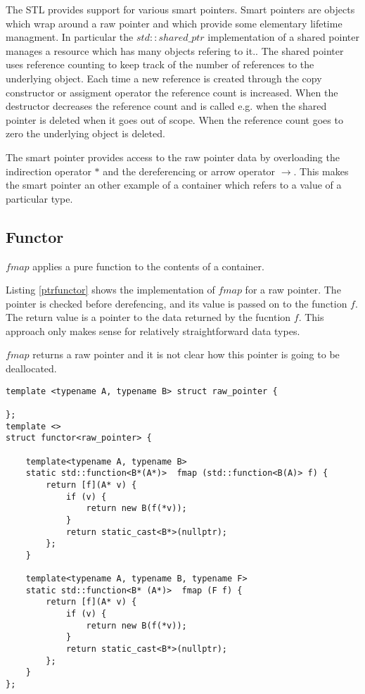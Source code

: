\documentclass[12pt,fleqn]{article}
\begin{document}
The STL provides support for various smart pointers.
Smart pointers are objects which wrap around a raw pointer and which provide some elementary lifetime managment.
In particular the $std::shared\_ptr$ implementation of a shared pointer manages a resource which has many objects refering to it..
The shared pointer uses reference counting to keep track of the number of references to the underlying object.
Each time a new reference is created through the copy constructor or assigment operator the reference count is increased.
When the destructor decreases the reference count and is called e.g. when the shared pointer is deleted when it goes out of scope.
When the reference count goes to zero the underlying object is deleted.

The smart pointer provides access to the raw pointer data by overloading the indirection operator $*$ and the dereferencing or arrow operator $\rightarrow$.
This makes the smart pointer an other example of a container which refers to a value of a particular type.


%
\subsection{Functor}
%
%
%

$fmap$ applies a pure function to the contents of a container.

Listing \ref{ptrfunctor} shows the implementation of $fmap$ for a raw pointer.
The pointer is checked before derefencing, and its value is passed on to the function $f$.
The return value is a pointer to the data returned by the fucntion $f$.
This approach only makes sense for relatively straightforward data types.

$fmap$ returns a raw pointer and it is not clear how this pointer is going to be deallocated.

\begin{minipage}{\linewidth}
\begin{lstlisting}[caption=functor implemention for a raw pointer, label=ptrfunctor]
template <typename A, typename B> struct raw_pointer {
  
};
template <>
struct functor<raw_pointer> {

	template<typename A, typename B>
	static std::function<B*(A*)>  fmap (std::function<B(A)> f) {
		return [f](A* v) {
			if (v) {
				return new B(f(*v)); 
			}
			return static_cast<B*>(nullptr); 
		};
	}

	template<typename A, typename B, typename F>
	static std::function<B* (A*)>  fmap (F f) {
		return [f](A* v) {
			if (v) {
				return new B(f(*v)); 
			}
			return static_cast<B*>(nullptr); 
		};
	}
};

\end{lstlisting}
\end{minipage}
\end{document}

